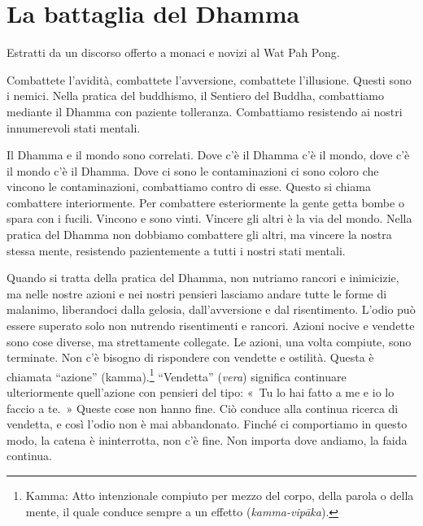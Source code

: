 \chapter{La battaglia del Dhamma}

\begin{openingQuote}
  \centering

  Estratti da un discorso offerto a monaci e novizi al Wat Pah Pong.
\end{openingQuote}

Combattete l'avidità, combattete l'avversione, combattete l'illusione.
Questi sono i nemici. Nella pratica del buddhismo, il Sentiero del
Buddha, combattiamo mediante il Dhamma con paziente tolleranza.
Combattiamo resistendo ai nostri innumerevoli stati mentali.

Il Dhamma e il mondo sono correlati. Dove c'è il Dhamma c'è il mondo,
dove c'è il mondo c'è il Dhamma. Dove ci sono le contaminazioni ci sono
coloro che vincono le contaminazioni, combattiamo contro di esse. Questo
si chiama combattere interiormente. Per combattere esteriormente la
gente getta bombe o spara con i fucili. Vincono e sono vinti. Vincere
gli altri è la via del mondo. Nella pratica del Dhamma non dobbiamo
combattere gli altri, ma vincere la nostra stessa mente, resistendo
pazientemente a tutti i nostri stati mentali.

Quando si tratta della pratica del Dhamma, non nutriamo rancori e
inimicizie, ma nelle nostre azioni e nei nostri pensieri lasciamo andare
tutte le forme di malanimo, liberandoci dalla gelosia, dall'avversione
e dal risentimento. L'odio può essere superato solo non nutrendo
risentimenti e rancori. Azioni nocive e vendette sono cose diverse, ma
strettamente collegate. Le azioni, una volta compiute, sono terminate.
Non c'è bisogno di rispondere con vendette e ostilità. Questa è chiamata
``azione'' (kamma).\footnote{Kamma: Atto intenzionale
  compiuto per mezzo del corpo, della parola o della mente, il quale
  conduce sempre a un effetto (\emph{kamma-vipāka}).} ``Vendetta''
(\emph{vera}) significa continuare ulteriormente quell'azione con
pensieri del tipo: «~Tu lo hai fatto a me e io lo faccio a te.~» Queste
cose non hanno fine. Ciò conduce alla continua ricerca di vendetta, e
così l'odio non è mai abbandonato. Finché ci comportiamo in questo modo,
la catena è ininterrotta, non c'è fine. Non importa dove andiamo, la
faida continua.

